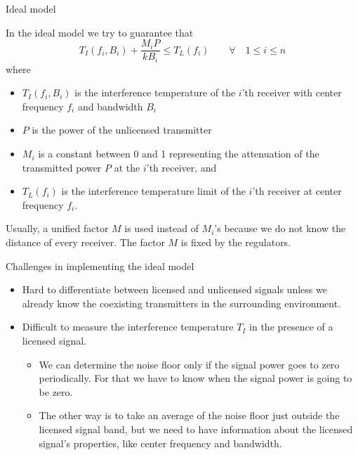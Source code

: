 \documentclass[mathserif]{beamer}
\begin{document}
\begin{frame}{Ideal model}

In the ideal model we try to guarantee that
\begin{equation}
    T_I(f_i,B_i) + \frac{M_iP}{kB_i} \leq T_L(f_i) \qquad \forall \quad 1 \leq i \leq n \label{idealModel}
\end{equation}
where

\pause
\begin{itemize}
	
	\item $T_I(f_i,B_i)$ is  the interference temperature of the $i$'th receiver with center frequency $f_i$ and bandwidth $B_i$
	\item $P$ is the power of the unlicensed transmitter
	\item $M_i$ is a constant between 0 and 1 representing the attenuation of the  transmitted power $P$ at the $i$'th receiver, and
	\item $T_L(f_i)$ is the interference temperature limit of the $i$'th receiver at center frequency $f_i$.
\end{itemize}

\pause
Usually, a unified factor $M$ is used instead of $M_i$'s because we do not know the distance of every receiver. The factor $M$ is fixed by the regulators.

\end{frame}




\begin{frame}{Challenges in implementing the ideal model}

\begin{itemize}
    \item Hard to differentiate between licensed and unlicensed signals unless we already know the coexisting transmitters in the surrounding environment.
    \item Difficult to measure the interference temperature $T_I$ in the presence of a licensed signal. \begin{itemize}
    \item We can determine the noise floor only if the signal power goes to zero periodically. For that we have to know when the signal power is going to be zero.
    \item The other way is to take an average of the noise floor just outside the licensed signal band, but we need to have information about the licensed signal's properties, like center frequency and bandwidth.
    \end{itemize}
\end{itemize}

\end{frame}
\end{document}
